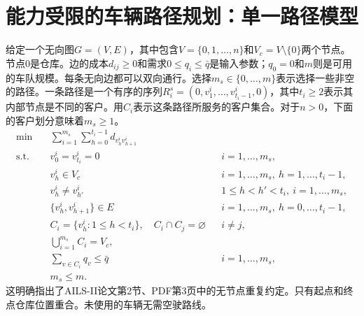 \documentclass{article}
\begin{document}
\section*{能力受限的车辆路径规划：单一路径模型}
给定一个无向图$G=(V,E)$，其中包含$V=\{0,1,\ldots,n\}$和$V_c=V\setminus\{0\}$两个节点。节点$0$是仓库。边的成本$d_{ij}\ge0$和需求$0\le q_i\le\bar q$是输入参数；$q_0=0$和$m$则是可用的车队规模。每条无向边都可以双向通行。选择$m_s\in\{0,\ldots,m\}$表示选择一些非空的路径。一条路径是一个有序的序列$R_i^s=(0,v_1^i,\ldots,v_{t_i-1}^i,0)$，其中$t_i\ge2$表示其内部节点是不同的客户。用$C_i$表示这条路径所服务的客户集合。对于$n>0$，下面的客户划分意味着$m_s\ge1$。
\begin{align*}
\min\quad &\sum_{i=1}^{m_s}\sum_{h=0}^{t_i-1}d_{v_h^i v_{h+1}^i}\\
\text{s.t.}\quad &v_0^i=v_{t_i}^i=0 && i=1,\ldots,m_s,\\
&v_h^i\in V_c &&i=1,\ldots,m_s,\ h=1,\ldots,t_i-1,\\
&v_h^i\ne v_{h'}^i &&1\le h<h'<t_i,\ i=1,\ldots,m_s,\\
&\{v_h^i,v_{h+1}^i\}\in E &&i=1,\ldots,m_s,\ h=0,\ldots,t_i-1,\\
&C_i=\{v_h^i:1\le h<t_i\},\quad C_i\cap C_j=\varnothing &&i\ne j,\\
&\bigcup_{i=1}^{m_s}C_i=V_c,\\
&\sum_{v\in C_i}q_v\le\bar q &&i=1,\ldots,m_s,\\
&m_s\le m.
\end{align*}
这明确指出了AILS-II论文第2节、PDF第3页中的无节点重复约定。只有起点和终点仓库位置重合。未使用的车辆无需空驶路线。 
\end{document}
